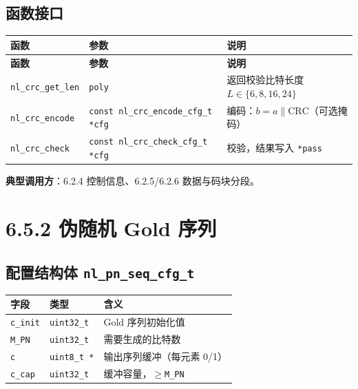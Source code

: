 \documentclass[11pt,a4paper]{ctexart}
\begin{document}
\subsection{函数接口}

\begin{longtable}{@{}L{4.2cm}L{4.5cm}L{5.8cm}@{}}
\toprule
\textbf{函数} & \textbf{参数} & \textbf{说明} \\
\midrule
\endfirsthead
\toprule\textbf{函数}&\textbf{参数}&\textbf{说明}\\\midrule\endhead
\texttt{nl\_crc\_get\_len} & \texttt{poly} & 返回校验比特长度 $L\in\{6,8,16,24\}$ \\
\texttt{nl\_crc\_encode} & \texttt{const nl\_crc\_encode\_cfg\_t *cfg} & 编码：$b = a \| \mathrm{CRC}$（可选掩码） \\
\texttt{nl\_crc\_check} & \texttt{const nl\_crc\_check\_cfg\_t *cfg} & 校验，结果写入 \texttt{*pass} \\
\bottomrule
\end{longtable}

\textbf{典型调用方}：6.2.4 控制信息、6.2.5/6.2.6 数据与码块分段。

\newpage
\section{6.5.2 伪随机 Gold 序列}

\subsection{配置结构体 \texttt{nl\_pn\_seq\_cfg\_t}}

\begin{table}[h]
\centering
\small
\begin{tabular}{lll}
\toprule
\textbf{字段} & \textbf{类型} & \textbf{含义} \\
\midrule
\texttt{c\_init} & \texttt{uint32\_t} & Gold 序列初始化值 \\
\texttt{M\_PN} & \texttt{uint32\_t} & 需要生成的比特数 \\
\texttt{c} & \texttt{uint8\_t *} & 输出序列缓冲（每元素 0/1） \\
\texttt{c\_cap} & \texttt{uint32\_t} & 缓冲容量，$\ge$\texttt{M\_PN} \\
\bottomrule
\end{tabular}
\end{table}
\end{document}
